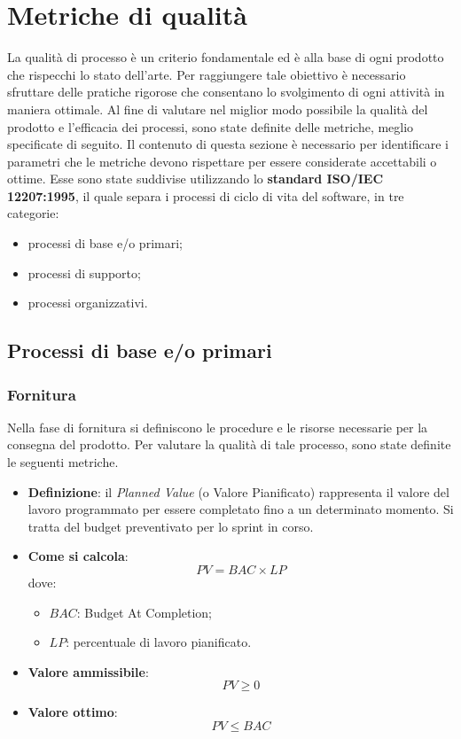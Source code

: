 \section{Metriche di qualità}
La qualità di processo è un criterio fondamentale ed è alla base di ogni prodotto che rispecchi lo stato dell'arte. Per raggiungere tale obiettivo è necessario sfruttare delle pratiche rigorose che consentano lo svolgimento di ogni attività in maniera ottimale. Al fine di valutare nel miglior modo possibile la qualità del prodotto e l'efficacia dei processi, sono state definite delle metriche, meglio specificate di seguito. Il contenuto di questa sezione è necessario per identificare i parametri che le metriche devono rispettare per essere considerate accettabili o ottime. Esse sono state suddivise utilizzando lo \textbf{standard ISO/IEC 12207:1995}, il quale separa i processi di ciclo di vita del software, in tre categorie: %
\begin{itemize}
	\item processi di base e/o primari;
	\item processi di supporto;
	\item processi organizzativi.
\end{itemize}

\subsection{Processi di base e/o primari}

\subsubsection{Fornitura}
Nella fase di fornitura si definiscono le procedure e le risorse necessarie per la consegna del prodotto. Per valutare la qualità di tale processo, sono state definite le seguenti metriche.

\begin{itemize}
	\item \textbf{Definizione}: il \textit{Planned Value} (o Valore Pianificato) rappresenta il valore del lavoro programmato per essere completato fino a un determinato momento. Si tratta del budget preventivato per lo sprint in corso.
	\item \textbf{Come si calcola}: \begin{equation*}PV = BAC \times LP\end{equation*} dove:
		\begin{itemize}
			\item $BAC$: Budget At Completion;
			\item $LP$: percentuale di lavoro pianificato.
		\end{itemize}
	\item \textbf{Valore ammissibile}: \begin{equation*}PV \geq 0\end{equation*}
	\item \textbf{Valore ottimo}: \begin{equation*}PV \leq BAC\end{equation*}
\end{itemize}


